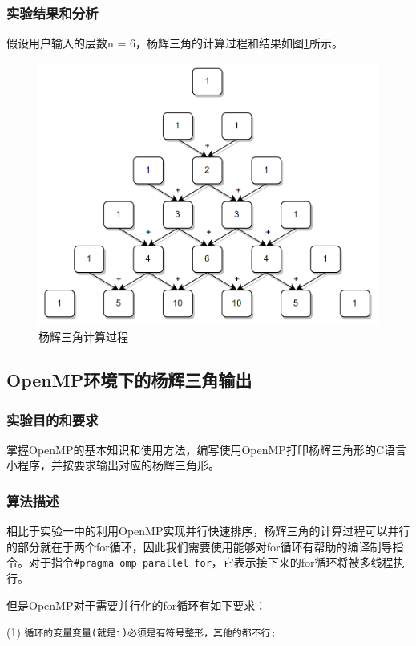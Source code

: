 \documentclass[supercite]{Experimental_Report}
\theoremstyle{definition}
\begin{document}
\subsubsection{实验结果和分析}
假设用户输入的层数n = 6，杨辉三角的计算过程和结果如图\ref{fig:p3}所示。

\begin{figure}[ht]
\centering
\includegraphics[scale=0.5]{杨辉三角.png}
\caption{杨辉三角计算过程}
\label{fig:p3}
\end{figure}


\subsection{OpenMP环境下的杨辉三角输出}
\subsubsection{实验目的和要求}
掌握OpenMP的基本知识和使用方法，编写使用OpenMP打印杨辉三角形的C语言小程序，并按要求输出对应的杨辉三角形。
\subsubsection{算法描述}
相比于实验一中的利用OpenMP实现并行快速排序，杨辉三角的计算过程可以并行的部分就在于两个for循环，因此我们需要使用能够对for循环有帮助的编译制导指令。对于指令\texttt{\#pragma omp parallel for}，它表示接下来的for循环将被多线程执行。

但是OpenMP对于需要并行化的for循环有如下要求：

(1) \texttt{循环的变量变量(就是i)必须是有符号整形，其他的都不行;}
\end{document}
